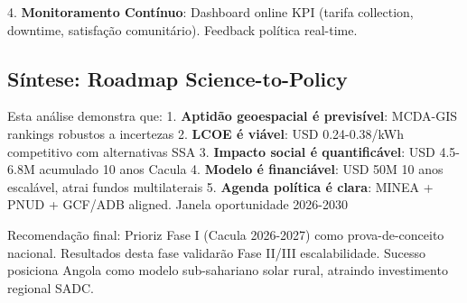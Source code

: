 \documentclass[12pt, a4paper]{article}
\begin{document}
4. \textbf{Monitoramento Contínuo}: Dashboard online KPI (tarifa collection, downtime, satisfação comunitário). Feedback política real-time.

\subsection{Síntese: Roadmap Science-to-Policy}

Esta análise demonstra que:
1. \textbf{Aptidão geoespacial é previsível}: MCDA-GIS rankings robustos a incertezas
2. \textbf{LCOE é viável}: USD 0.24-0.38/kWh competitivo com alternativas SSA
3. \textbf{Impacto social é quantificável}: USD 4.5-6.8M acumulado 10 anos Cacula
4. \textbf{Modelo é financiável}: USD 50M 10 anos escalável, atrai fundos multilaterais
5. \textbf{Agenda política é clara}: MINEA + PNUD + GCF/ADB aligned. Janela oportunidade 2026-2030

Recomendação final: Prioriz Fase I (Cacula 2026-2027) como prova-de-conceito nacional. Resultados desta fase validarão Fase II/III escalabilidade. Sucesso posiciona Angola como modelo sub-sahariano solar rural, atraindo investimento regional SADC.
\end{document}
